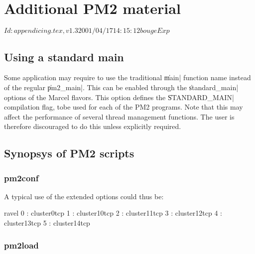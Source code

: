 \chapter{Additional PM2 material}

\stamp $Id: appendicing.tex,v 1.3 2001/04/17 14:15:12 bouge Exp $

\section{Using a standard main}
\label{sec:tradimain}

Some application may require to use the traditional \|main| function
name instead of the regular \|pm2_main|. This can be enabled through
the \|standard_main| options of the Marcel flavors. This option
defines the \|STANDARD_MAIN| compilation flag, tobe used for each of
the PM2 programs. Note that this may affect the performance of several
thread management functions. The user is therefore discouraged to do
this unless explicitly required.

\section{Synopsys of PM2 scripts}
\label{sec:scripts}

\subsection{pm2conf}


A typical use of the extended options could thus be:
\begin{shell}
ravel%
0 : cluster0tcp
1 : cluster10tcp
2 : cluster11tcp
3 : cluster12tcp
4 : cluster13tcp
5 : cluster14tcp
\end{shell}

\subsection{pm2load}

